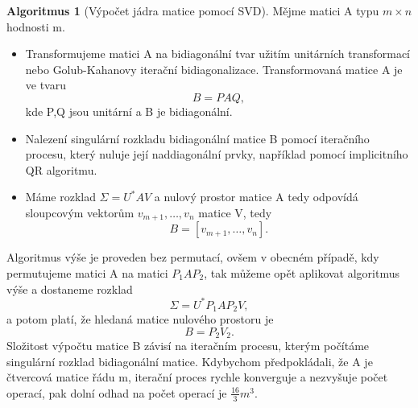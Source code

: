 \documentclass{article}
\theoremstyle{plain}
\theoremstyle{definition}
\newtheorem{algoritmus}{Algoritmus}
\begin{document}
\begin{algoritmus}[Výpočet jádra matice pomocí SVD]
    Mějme matici A typu $m \times n$ hodnosti m.
    \begin{itemize}
        \item Transformujeme matici A na bidiagonální tvar užitím unitárních transformací nebo Golub-Kahanovy iterační bidiagonalizace. Transformovaná matice A je ve tvaru
        \[B=PAQ,\]
        kde P,Q jsou unitární a B je bidiagonální.
        \item Nalezení singulární rozkladu bidiagonální matice B pomocí iteračního procesu, který nuluje její naddiagonální prvky, například pomocí implicitního QR algoritmu.
        \item Máme rozklad $\Sigma=U^*AV$ a nulový prostor matice A tedy odpovídá sloupcovým vektorům $v_{m+1},\hdots,v_n$ matice V, tedy 
        \[B=[v_{m+1},\hdots,v_n].\]
    \end{itemize}
\end{algoritmus}
Algoritmus výše je proveden bez permutací, ovšem v obecném případě, kdy permutujeme matici A na matici $P_1AP_2$, tak můžeme opět aplikovat algoritmus výše a dostaneme rozklad
\[\Sigma=U^*P_1AP_2V,\]
a potom platí, že hledaná matice nulového prostoru je
\[B=P_2V_2.\]
Složitost výpočtu matice B závisí na iteračním procesu, kterým počítáme singulární rozklad bidiagonální matice. Kdybychom předpokládali, že A je čtvercová matice řádu m, iterační proces rychle konverguje a nezvyšuje počet operací, pak dolní odhad na počet operací je $\frac{16}{3}  m^3$.
\end{document}
